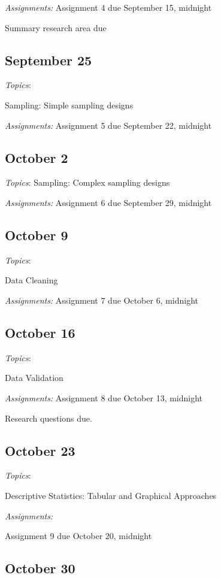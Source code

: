 \documentclass[12pt]{article}
\begin{document}
\begin{flushleft}
\textit {Assignments:}
Assignment 4 due September 15, midnight

Summary research area due

\subsection{September 25}


\textit{Topics}:

Sampling: Simple sampling designs

\textit {Assignments:}
Assignment 5 due September 22, midnight
\subsection{October 2}


\textit{Topics}:
Sampling: Complex sampling designs


\textit {Assignments:}
Assignment 6 due September 29, midnight
\subsection{October 9}


\textit{Topics}:

Data Cleaning

\textit {Assignments:}
Assignment 7 due October 6, midnight

\subsection{October 16}


\textit{Topics}:

Data Validation

\textit {Assignments:}
Assignment 8 due October 13, midnight

Research questions due. 

\subsection{October 23}


\textit{Topics}:

Descriptive Statistics: Tabular and Graphical Approaches

\textit {Assignments:}

Assignment 9 due  October 20, midnight

\subsection{October 30}



\end{flushleft}
\end{document}
